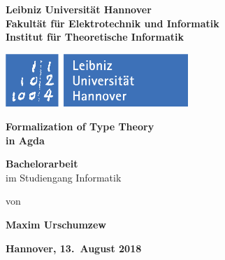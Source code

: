 
\begin{titlepage}
%
\vspace*{1em}

\begin{minipage}{0.6\textwidth}
\large {%
	\textbf{Leibniz Universität Hannover}\\ 
	\textbf{Fakultät für Elektrotechnik und Informatik}\\
	\textbf{Institut für Theoretische Informatik}\\
}
\end{minipage}
\hfill
\begin{minipage}{0.399\textwidth}
\vspace*{-15bp}
\parbox{\textwidth}{\includegraphics[height=2cm]{uni.png}}
\end{minipage}

%
\vspace*{0.07\textheight}
%
\begin{center}
\huge { \textbf{Formalization of Type Theory\\
in Agda} }
\end{center}
%
\vspace*{0.07\textheight}
%
\begin{center}
	\LARGE { \textbf{Bachelorarbeit} }\\
	\vspace*{1em}
	\Large im Studiengang Informatik
\end{center}
%
\begin{center}
\vspace*{0.5em}
\Large von
\vspace*{0.5em}
\end{center}
%
\begin{center}
\Large \textbf{Maxim Urschumzew}
\end{center}
%
\vspace*{0.05\textheight}

\begin{center}
\Large \textbf{Hannover, \expandafter{13.\ August 2018}}
\end{center}
%
\end{titlepage}

\restoregeometry

\cleardoublepage